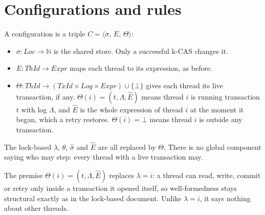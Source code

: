 \documentclass[manuscript,nonacm]{acmart}
\theoremstyle{acmdefinition}
\newcommand{\Loc}{\mathit{Loc}}
\newcommand{\ThId}{\mathit{ThId}}
\newcommand{\TrId}{\mathit{TxId}}
\newcommand{\Expr}{\mathit{Expr}}
\newcommand{\Log}{\mathit{Log}}
\newcommand{\Lg}{\Lambda}                         %
\newcommand{\txs}{\Theta}
\newcommand{\cfg}[3]{\langle #1,\, #2,\, #3 \rangle}
\begin{document}
\section{Configurations and rules}
\label{sec:rules}

A configuration is a triple $C = \cfg{\sigma}{E}{\txs}$:
\begin{itemize}
\item $\sigma : \Loc \to \mathbb{N}$ is the shared store. Only a successful
k-CAS changes it.
\item $E : \ThId \to \Expr$ maps each thread to its expression, as before.
\item $\txs : \ThId \to (\TrId \times \Log \times \Expr) \cup \{\bot\}$ gives each
thread its live transaction, if any. $\txs(i) = (t, \Lg, \hat E)$ means thread
$i$ is running transaction $t$ with log $\Lg$, and $\hat E$ is the whole
expression of thread $i$ at the moment it began, which a retry restores.
$\txs(i) = \bot$ means thread $i$ is outside any transaction.
\end{itemize}
The lock-based $\lambda$, $\theta$, $\hat\sigma$ and $\hat E$ are all replaced by
$\txs$. There is no global component saying who may step: every thread with a
live transaction may.

The premise $\txs(i) = (t,\Lg,\hat E)$ replaces $\lambda = i$: a thread can
read, write, commit or retry only inside a transaction it opened itself, so
well-formedness stays structural exactly as in the lock-based document. Unlike
$\lambda = i$, it says nothing about other threads.
\end{document}
